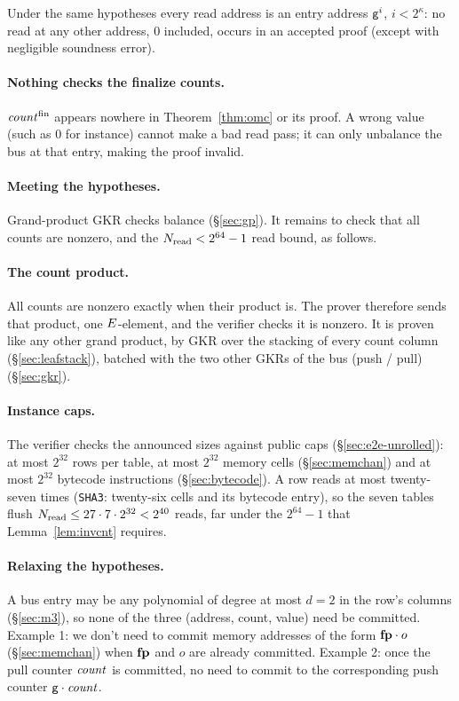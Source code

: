 \begin{corollary}\label{cor:addrrange}
Under the same hypotheses every read address is an entry address $\mathsf{g}^{i}$, $i<2^{\kappa}$: no read at any other address, $0$ included, occurs in an accepted proof (except with negligible soundness error).
\end{corollary}

\paragraph{Nothing checks the finalize counts.} $\mathit{count}^{\mathrm{fin}}$ appears nowhere in Theorem~\ref{thm:omc} or its proof. A wrong value (such as $0$ for instance) cannot make a bad read pass; it can only unbalance the bus at that entry, making the proof invalid.

\paragraph{Meeting the hypotheses.} Grand-product GKR checks balance (\S\ref{sec:gp}). It remains to check that all counts are nonzero, and the $N_{\mathrm{read}}<2^{64}-1$ read bound, as follows.

\paragraph{The count product.} All counts are nonzero exactly when their product is. The prover therefore sends that product, one $E$-element, and the verifier checks it is nonzero. It is proven like any other grand product, by GKR over the stacking of every count column (\S\ref{sec:leafstack}), batched with the two other GKRs of the bus (push / pull) (\S\ref{sec:gkr}).

\paragraph{Instance caps.} The verifier checks the announced sizes against public caps (\S\ref{sec:e2e-unrolled}): at most $2^{32}$ rows per table, at most $2^{32}$ memory cells (\S\ref{sec:memchan}) and at most $2^{32}$ bytecode instructions (\S\ref{sec:bytecode}). A row reads at most twenty-seven times (\texttt{SHA3}: twenty-six cells and its bytecode entry), so the seven tables flush $N_{\mathrm{read}}\le27\cdot7\cdot2^{32}<2^{40}$ reads, far under the $2^{64}-1$ that Lemma~\ref{lem:invcnt} requires.

\paragraph{Relaxing the hypotheses.} A bus entry may be any polynomial of degree at most $d = 2$ in the row's columns (\S\ref{sec:m3}), so none of the three (address, count, value) need be committed. Example 1: we don't need to commit memory addresses of the form $\mathbf{fp}\cdot o$ (\S\ref{sec:memchan}) when $\mathbf{fp}$ and $o$ are already committed. Example 2: once the pull counter $\mathit{count}$ is committed, no need to commit to the corresponding push counter $\mathsf{g}\cdot\mathit{count}$.

